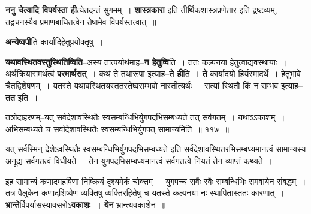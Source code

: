 \documentclass[article,12pt,a4paper]{memoir}
\begin{document}
	  \pstart \textbf{ननु चेत्यादि विपर्यस्ता ही}त्येतदन्तं सुगमम् । \textbf{शास्त्रकारा} इति तीर्थिकशास्त्रप्रणेतार इति द्रष्टव्यम्, तद्वचनस्यैव प्रमाणबाधितत्वेन तेषामेव विपर्यस्तत्वात् ॥
	\pend
      

	  \pstart \textbf{अन्येष्वपी}ति कार्यादिहेतुप्रयोक्तृषु ।
	\pend
      

	  \pstart \textbf{यथावस्थितवस्तुस्थितिष्विति}--अस्य तात्पर्यार्थमाह--\textbf{न हेतुष्वि}ति । ततः कल्पनया हेतुत्वाद्यवस्थायाः । अर्थक्रियासमर्थत्वं \textbf{परमार्थसत्} । कथं ते तथारूपा इत्याह--\textbf{ते ही}ति । \textbf{ते} कार्यादयो हिर्यस्मादर्थे । हेतुभावे चैतद्विशेषणम् । यतस्ते यथावस्थितयस्ततस्तेष्वसम्भवो नास्तीत्यर्थः । सत्यां स्थितौ किं न सम्भव इत्याह--\textbf{तत} इति ।    \leavevmode{} 
	  
	तत्रोदाहरणम्--यत् सर्वदेशावस्थितैः स्वसम्बन्धिभिर्युगपदभिसम्बध्यते तत् सर्वगतम् । यथाऽऽकाशम् । अभिसम्बध्यते च सर्वादेशावस्थितैः स्वसम्बन्धिभिर्युगपत् सामान्यमिति ॥ ११७ ॥ 
	  
	यत् सर्वस्मिन् देशेऽवस्थितैः स्वसम्बन्धिभिर्युगपदभिसम्बध्यते इति सर्वदेशावस्थितरभिसम्बध्यमानत्वं सामान्यस्य अनूद्य सर्वगतत्वं विधीयते । तेन युगपदभिसम्बध्यमानत्वं सर्वगतत्वे नियतं तेन व्याप्तं कथ्यते ।  
	  
	इह सामान्यं कणादमहर्षिणा निष्क्रियं दृश्यमेकं चोक्तम् । युगपच्च सर्वैः स्वैः सम्बन्धिभिः समवायेन संबद्धम् । तत्र पैलुकेन कणादशिष्येण व्यक्तिषु व्यक्तिरहितेषु च यतस्ते कल्पनया नः स्थापितास्ततः कारणात् । \textbf{भ्रान्ते}र्विपर्यासस्यावसरोऽ\textbf{वकाशः । येन} भ्रान्त्यवकाशेन ॥
	\pend
      
\end{document}
